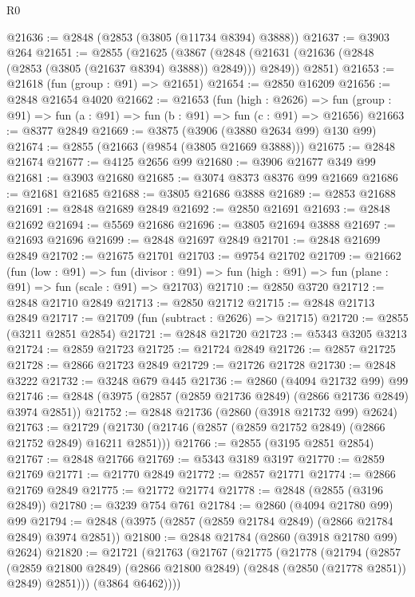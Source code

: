 \begin{lexlean}{R0}
\begin{coremodule}
@21636 := @2848 (@2853 (@3805 (@11734 @8394) @3888))
@21637 := @3903 @264
@21651 := @2855
    (@21625
      (@3867 (@2848 (@21631 (@21636 (@2848 (@2853 (@3805 (@21637 @8394) @3888)) @2849))) @2849))
      @2851)
@21653 := @21618 (fun (group : @91) => @21651)
@21654 := @2850 @16209
@21656 := @2848 @21654 @4020
@21662 := @21653
    (fun (high : @2626) =>
    fun (group : @91) => fun (a : @91) => fun (b : @91) => fun (c : @91) => @21656)
@21663 := @8377 @2849
@21669 := @3875 (@3906 (@3880 @2634 @99) @130 @99)
@21674 := @2855 (@21663 (@9854 (@3805 @21669 @3888)))
@21675 := @2848 @21674
@21677 := @4125 @2656 @99
@21680 := @3906 @21677 @349 @99
@21681 := @3903 @21680
@21685 := @3074 @8373 @8376 @99 @21669
@21686 := @21681 @21685
@21688 := @3805 @21686 @3888
@21689 := @2853 @21688
@21691 := @2848 @21689 @2849
@21692 := @2850 @21691
@21693 := @2848 @21692
@21694 := @5569 @21686
@21696 := @3805 @21694 @3888
@21697 := @21693 @21696
@21699 := @2848 @21697 @2849
@21701 := @2848 @21699 @2849
@21702 := @21675 @21701
@21703 := @9754 @21702
@21709 := @21662
    (fun (low : @91) =>
    fun (divisor : @91) => fun (high : @91) => fun (plane : @91) => fun (scale : @91) => @21703)
@21710 := @2850 @3720
@21712 := @2848 @21710 @2849
@21713 := @2850 @21712
@21715 := @2848 @21713 @2849
@21717 := @21709 (fun (subtract : @2626) => @21715)
@21720 := @2855 (@3211 @2851 @2854)
@21721 := @2848 @21720
@21723 := @5343 @3205 @3213
@21724 := @2859 @21723
@21725 := @21724 @2849
@21726 := @2857 @21725
@21728 := @2866 @21723 @2849
@21729 := @21726 @21728
@21730 := @2848 @3222
@21732 := @3248 @679 @445
@21736 := @2860 (@4094 @21732 @99) @99
@21746 := @2848 (@3975 (@2857 (@2859 @21736 @2849) (@2866 @21736 @2849) @3974 @2851))
@21752 := @2848 @21736 (@2860 (@3918 @21732 @99) @2624)
@21763 := @21729 (@21730 (@21746 (@2857 (@2859 @21752 @2849) (@2866 @21752 @2849) @16211 @2851)))
@21766 := @2855 (@3195 @2851 @2854)
@21767 := @2848 @21766
@21769 := @5343 @3189 @3197
@21770 := @2859 @21769
@21771 := @21770 @2849
@21772 := @2857 @21771
@21774 := @2866 @21769 @2849
@21775 := @21772 @21774
@21778 := @2848 (@2855 (@3196 @2849))
@21780 := @3239 @754 @761
@21784 := @2860 (@4094 @21780 @99) @99
@21794 := @2848 (@3975 (@2857 (@2859 @21784 @2849) (@2866 @21784 @2849) @3974 @2851))
@21800 := @2848 @21784 (@2860 (@3918 @21780 @99) @2624)
@21820 := @21721
    (@21763
      (@21767
        (@21775
          (@21778
            (@21794
              (@2857
                (@2859 @21800 @2849)
                (@2866 @21800 @2849)
                (@2848 (@2850 (@21778 @2851)) @2849)
                @2851)))
          (@3864 @6462))))

\end{coremodule}
\end{lexlean}
